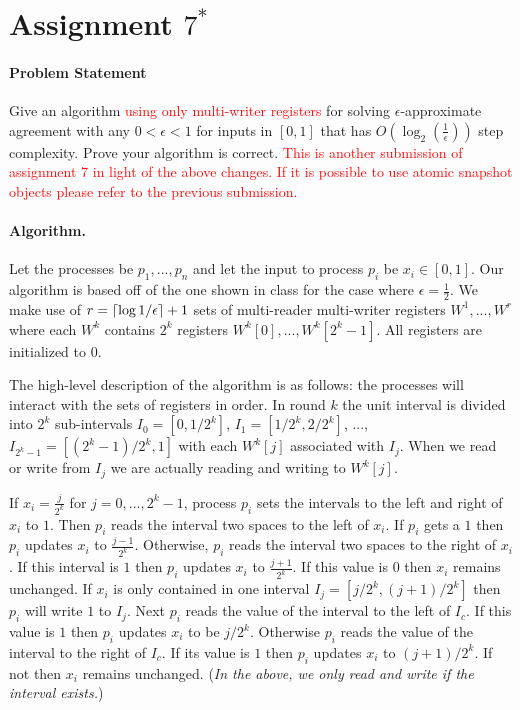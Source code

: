 \documentclass[11pt]{article}
\DeclarePairedDelimiter\ceil{\lceil}{\rceil}
\begin{document}
\rhead{\today}

\section*{Assignment $7^*$}
\paragraph{Problem Statement}
Give an algorithm \textcolor{red}{using only multi-writer registers} for solving $\epsilon$-approximate agreement with any $0 < \epsilon < 1$ for inputs in $[0,1]$ that has $O\left(\log_2\left(\frac{1}{\epsilon}\right)\right)$ step complexity. Prove your algorithm is correct. \textcolor{red}{This is another submission of assignment 7 in light of the above changes. If it is possible to use atomic snapshot objects please refer to the previous submission.}

\paragraph{Algorithm.}
Let the processes be $p_1, ..., p_n$ and let the input to process $p_i$ be $x_i \in [0,1]$. Our algorithm is based off of the one shown in class for the case where $\epsilon = \frac{1}{2}$. We make use of $r = \ceil{\log 1/\epsilon} + 1$ sets of multi-reader multi-writer registers $W^1, ..., W^r$ where each $W^k$ contains $2^k$ registers $W^k[0], ..., W^k[2^k-1]$. All registers are initialized to $0$.  

The high-level description of the algorithm is as follows: the processes will interact with the sets of registers in order. In round $k$ the unit interval is divided into $2^k$ sub-intervals $I_0 = [0,1/2^k]$, $I_1 = [1/2^k, 2/2^k]$, ..., $I_{2^k-1} = [(2^k-1)/2^k, 1]$ with each $W^k[j]$ associated with $I_j$. When we read or write from $I_j$ we are actually reading and writing to $W^k[j]$. 

If $x_i = \frac{j}{2^k}$ for $j = 0, ..., 2^k-1$, process $p_i$ sets the intervals to the left and right of $x_i$ to $1$. Then $p_i$ reads the interval two spaces to the left of $x_i$. If $p_i$ gets a $1$ then $p_i$ updates $x_i$ to $\frac{j-1}{2^{k}}$. Otherwise, $p_i$ reads the interval two spaces to the right of $x_i$. If this interval is $1$ then $p_i$ updates $x_i$ to $\frac{j+1}{2^{k}}$. If this value is $0$ then $x_i$ remains unchanged. If $x_i$ is only contained in one interval $I_j = [j/2^k, (j+1)/2^k]$ then $p_i$ will write $1$ to $I_j$. Next $p_i$ reads the value of the interval to the left of $I_c$. If this value is $1$ then $p_i$ updates $x_i$ to be $j/2^k$. Otherwise $p_i$ reads the value of the interval to the right of $I_c$. If its value is $1$ then $p_i$ updates $x_i$ to $(j+1)/2^k$. If not then $x_i$ remains unchanged. (\emph{In the above, we only read and write if the interval exists.}) 
\end{document}
